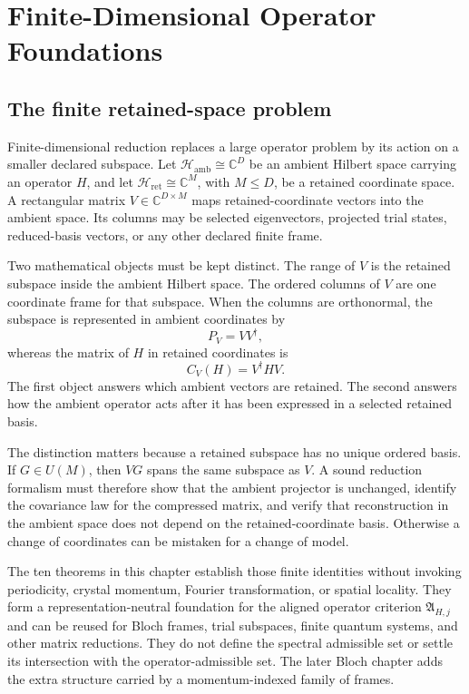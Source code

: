 \chapter{Finite-Dimensional Operator Foundations}
\label{ch:finite-operator-foundations}

\section{The finite retained-space problem}

Finite-dimensional reduction replaces a large operator problem by its action on a
smaller declared subspace. Let $\mathcal H_{\mathrm{amb}}\cong\mathbb C^D$ be an ambient
Hilbert space carrying an operator $H$, and let
$\mathcal H_{\mathrm{ret}}\cong\mathbb C^M$, with $M\leq D$, be a retained coordinate
space. A rectangular matrix $V\in\mathbb C^{D\times M}$ maps retained-coordinate vectors
into the ambient space. Its columns may be selected eigenvectors, projected trial
states, reduced-basis vectors, or any other declared finite frame.

Two mathematical objects must be kept distinct. The range of $V$ is the retained
subspace inside the ambient Hilbert space. The ordered columns of $V$ are one coordinate
frame for that subspace. When the columns are orthonormal, the subspace is represented
in ambient coordinates by
\[
  P_V=VV^\dagger,
\]
whereas the matrix of $H$ in retained coordinates is
\[
  C_V(H)=V^\dagger HV.
\]
The first object answers which ambient vectors are retained. The second answers how the
ambient operator acts after it has been expressed in a selected retained basis.

The distinction matters because a retained subspace has no unique ordered basis. If
$G\in U(M)$, then $VG$ spans the same subspace as $V$. A sound reduction formalism must
therefore show that the ambient projector is unchanged, identify the covariance law for
the compressed matrix, and verify that reconstruction in the ambient space does not
depend on the retained-coordinate basis. Otherwise a change of coordinates can be
mistaken for a change of model.

The ten theorems in this chapter establish those finite identities without invoking
periodicity, crystal momentum, Fourier transformation, or spatial locality. They form a
representation-neutral foundation for the aligned operator criterion
$\mathfrak A_{H,j}$ and can be reused for Bloch frames, trial subspaces, finite quantum
systems, and other matrix reductions. They do not define the spectral admissible set or
settle its intersection with the operator-admissible set. The later Bloch chapter adds
the extra structure carried by a momentum-indexed family of frames.

